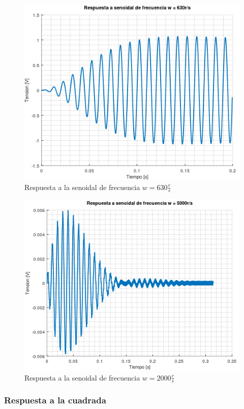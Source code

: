 \documentclass[11pt,a4paper]{report}
\begin{document}
\newpage
\begin{figure}[h!]
\includegraphics[scale=1]{RtaSenoidalMedio.png}
\caption{Respuesta a la senoidal de frecuencia $w = 630\frac{r}{s}$}
\end{figure}

\newpage
\begin{figure}[h!]
\includegraphics[scale=1]{RtaSenoidalAlto.png}
\caption{Respuesta a la senoidal de frecuencia $w = 2000\frac{r}{s}$}
\end{figure}

\newpage
\subsubsection*{Respuesta a la cuadrada}
\end{document}
